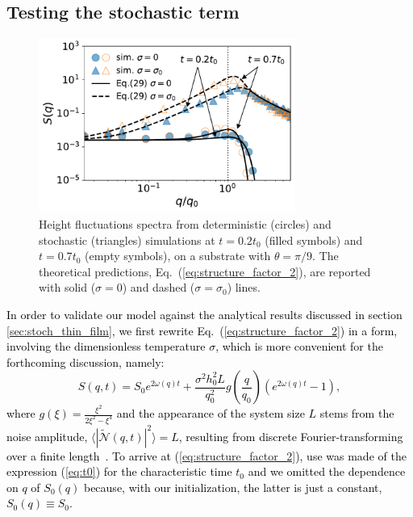 \subsection{Testing the stochastic term}\label{subsec:validation}
\begin{figure}
    \centering
    \includegraphics[width=0.75\textwidth]{graphics/spectrum_theta_20_nob_fill_pattern.pdf}
    \caption{Height fluctuations spectra from deterministic (circles) and stochastic (triangles) simulations at $t=0.2 t_0$ (filled symbols) and $t=0.7 t_0$ (empty symbols), 
    on a substrate with $\theta =\pi/9$. The theoretical predictions, Eq.~(\ref{eq:structure_factor_2}), are reported with solid ($\sigma=0$) and dashed ($\sigma = \sigma_0$) lines.
    }
    \label{fig:theory_simulation_structure_factor}
\end{figure}
\textcolor{black}{In order to validate our model against the analytical results discussed
in section \ref{sec:stoch_thin_film}, we first rewrite Eq.~(\ref{eq:structure_factor_2}) in a form, involving the dimensionless temperature $\sigma$, which is more 
convenient for the forthcoming discussion, namely:
\begin{equation}\label{eq:structure_factor_2}
    S(q,t) = S_0 e^{2\omega(q)t} + \frac{\sigma^2 h_0^2 L}{q_0^2}g\left(\frac{q}{q_0}\right)(e^{2\omega(q)t} - 1),
\end{equation}
where $g(\xi) = \frac{\xi^2}{2\xi^2 - \xi^4}$ and the appearance of the system size $L$ stems from the noise amplitude, $\langle |\tilde{\mathcal{N}}(q,t)|^2 \rangle = L$, 
resulting from discrete Fourier-transforming 
over a finite length~\cite{PhysRevE.100.023108,PhysRevE.102.053105}. To arrive at (\ref{eq:structure_factor_2}), use was made of the expression (\ref{eq:t0}) for the characteristic time $t_0$
and we omitted the dependence on $q$ of $S_0(q)$ because, with our initialization, the latter is just a constant, $S_0(q)\equiv S_0$.}
